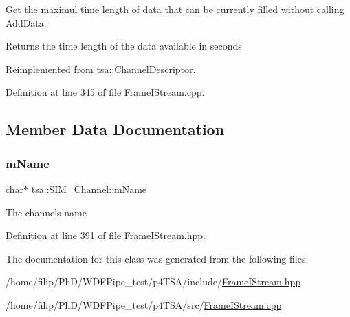 Get the maximul time length of data that can be currently filled without calling Add\+Data.

\begin{DoxyReturn}{Returns}
the time length of the data available in seconds 
\end{DoxyReturn}


Reimplemented from \hyperlink{classtsa_1_1_channel_descriptor_a456d14e6136c389fbd307fabab7d7b73}{tsa\+::\+Channel\+Descriptor}.



Definition at line 345 of file Frame\+I\+Stream.\+cpp.



\subsection{Member Data Documentation}
\mbox{\label{classtsa_1_1_s_i_m___channel_a927b435b91632d523d59b89f75a01c66}} 
\subsubsection{\texorpdfstring{m\+Name}{mName}}
{\footnotesize\ttfamily char$\ast$ tsa\+::\+S\+I\+M\+\_\+\+Channel\+::m\+Name\hspace{0.3cm}{\ttfamily [private]}}

The channel\textquotesingle{}s name 

Definition at line 391 of file Frame\+I\+Stream.\+hpp.



The documentation for this class was generated from the following files\+:\begin{DoxyCompactItemize}
\item 
/home/filip/\+Ph\+D/\+W\+D\+F\+Pipe\+\_\+test/p4\+T\+S\+A/include/\hyperlink{_frame_i_stream_8hpp}{Frame\+I\+Stream.\+hpp}\item 
/home/filip/\+Ph\+D/\+W\+D\+F\+Pipe\+\_\+test/p4\+T\+S\+A/src/\hyperlink{_frame_i_stream_8cpp}{Frame\+I\+Stream.\+cpp}\end{DoxyCompactItemize}
